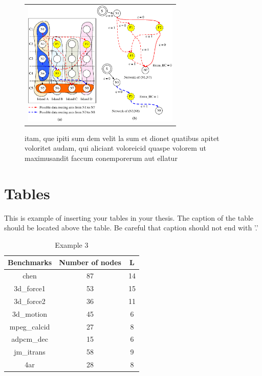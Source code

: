 \documentclass[doctor]{ewhacse}
\begin{document}
\begin{figure}[htbp]
	{
		\begin{center}
			\begin{tabular}{c}
				\includegraphics[height=6cm]{Sample.eps}
			\end{tabular}
		\end{center}
	}
	\caption{itam, que ipiti sum dem velit la sum et dionet quatibus apitet voloritet audam, qui aliciant voloreicid quaspe volorem ut maximusandit faccum conemporerum aut ellatur}
\end{figure}
\newpage

\section{Tables}
\par %

This is example of inserting your tables in your thesis. The
caption of the table should be located above the table. Be
careful that caption should not end with '.'
\begin{table}[htbp]
	\begin{center}
		\caption{Example 3} \label{tab1}
		\begin{tabular}{|c|c|c|} \hline
			Benchmarks & Number of nodes  & L\\ \hline
			\hline {\sc chen} & 87  & 14\\ \hline {\sc 3d\_force1} & 53  & 15\\
			\hline {\sc 3d\_force2} & 36  & 11\\ \hline {\sc 3d\_motion} & 45  &
			6\\ \hline {\sc mpeg\_calcid} & 27  & 8\\ \hline {\sc adpcm\_dec} &
			15  & 6 \\ \hline {\sc jm\_itrans} & 58  & 9\\ \hline {\sc 4ar} & 28
			& 8\\ \hline
		\end{tabular}
	\end{center}
\end{table}
\end{document}
